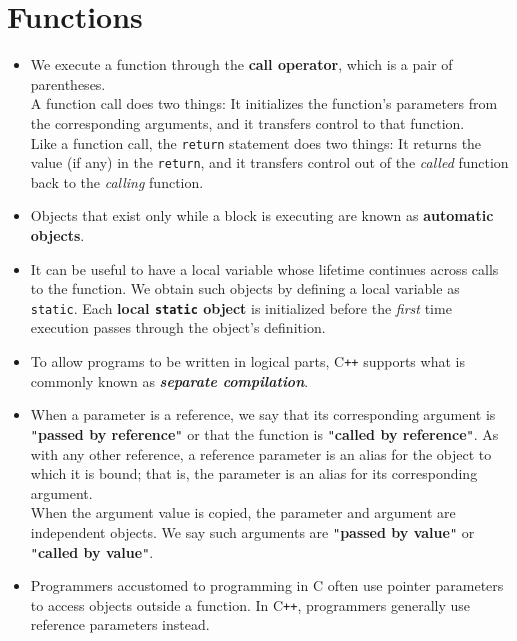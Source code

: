 \section{Functions}
\begin{itemize}

\item
We execute a function through the \textbf{call operator}, which is a pair of parentheses.\\
A function call does two things: It initializes the function's parameters from the corresponding arguments, and it transfers control to that function.\\
Like a function call, the \texttt{return} statement does two things: It returns the value (if any) in the \texttt{return}, and it transfers control out of the \textit{called} function back to the \textit{calling} function.

\item
Objects that exist only while a block is executing are known as \textbf{automatic objects}.

\item
It can be useful to have a local variable whose lifetime continues across calls to the function. We obtain such objects by defining a local variable as \texttt{static}. Each \textbf{local \texttt{static} object} is initialized before the \textit{first} time execution passes through the object's definition.

\item
To allow programs to be written in logical parts, C\texttt{++} supports what is commonly known as \textbf{\textit{separate compilation}}.

\item
When a parameter is a reference, we say that its corresponding argument is \texttt{"}\textbf{passed by reference}\texttt{"} or that the function is \texttt{"}\textbf{called by reference}\texttt{"}. As with any other reference, a reference parameter is an alias for the object to which it is bound; that is, the parameter is an alias for its corresponding argument.\\
When the argument value is copied, the parameter and argument are independent objects. We say such arguments are \texttt{"}\textbf{passed by value}\texttt{"} or \texttt{"}\textbf{called by value}\texttt{"}.

\item
Programmers accustomed to programming in C often use pointer parameters to access objects outside a function. In C\texttt{++}, programmers generally use reference parameters instead.


\end{itemize}
